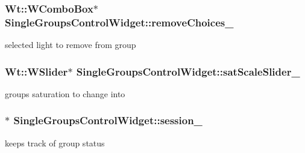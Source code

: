 \subsubsection[{\texorpdfstring{remove\+Choices\+\_\+}{removeChoices_}}]{\setlength{\rightskip}{0pt plus 5cm}Wt\+::\+W\+Combo\+Box$\ast$ Single\+Groups\+Control\+Widget\+::remove\+Choices\+\_\+\hspace{0.3cm}{\ttfamily [private]}}\hypertarget{classSingleGroupsControlWidget_ad4558a087cef943d29674ec5ffd66381}{}\label{classSingleGroupsControlWidget_ad4558a087cef943d29674ec5ffd66381}
selected light to remove from group 
\subsubsection[{\texorpdfstring{sat\+Scale\+Slider\+\_\+}{satScaleSlider_}}]{\setlength{\rightskip}{0pt plus 5cm}Wt\+::\+W\+Slider$\ast$ Single\+Groups\+Control\+Widget\+::sat\+Scale\+Slider\+\_\+\hspace{0.3cm}{\ttfamily [private]}}\hypertarget{classSingleGroupsControlWidget_ad41ed79fdff6691c6266f1a582b9962e}{}\label{classSingleGroupsControlWidget_ad41ed79fdff6691c6266f1a582b9962e}
group\textquotesingle{}s saturation to change into 
\subsubsection[{\texorpdfstring{session\+\_\+}{session_}}]{$\ast$ Single\+Groups\+Control\+Widget\+::session\+\_\+\hspace{0.3cm}{\ttfamily [private]}}\hypertarget{classSingleGroupsControlWidget_af179b3aceb389ea2b7eb196c0cf2575d}{}\label{classSingleGroupsControlWidget_af179b3aceb389ea2b7eb196c0cf2575d}
keeps track of group status 
